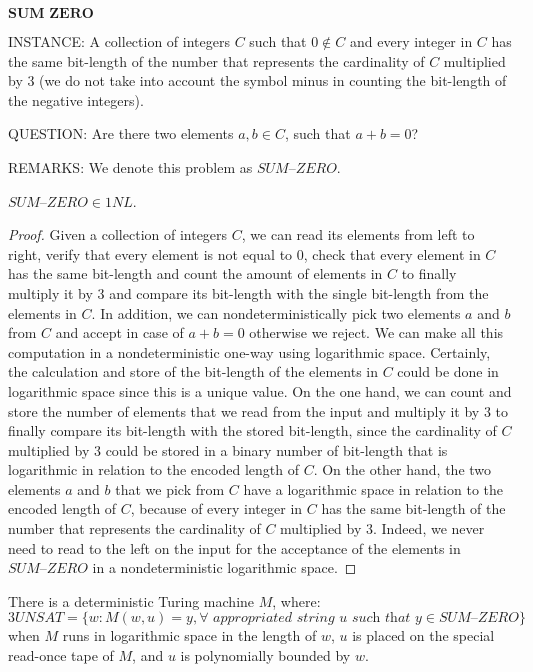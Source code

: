 \documentclass[a4paper,UKenglish,cleveref, autoref]{lipics-v2019}
\begin{document}
\begin{definition}
$\textbf{SUM ZERO}$

INSTANCE: A collection of integers $C$ such that $0 \notin C$ and every integer in $C$ has the same bit-length of the number that represents the cardinality of $C$ multiplied by $3$ (we do not take into account the symbol minus in counting the bit-length of the negative integers).

QUESTION: Are there two elements $a, b \in C$, such that $a + b = 0$?

REMARKS: We denote this problem as $\textit{SUM--ZERO}$.
\end{definition}


\begin{theorem}
\label{1nl}
$\textit{SUM--ZERO} \in 1NL$.
\end{theorem}

\begin{proof}
Given a collection of integers $C$, we can read its elements from left to right, verify that every element is not equal to $0$, check that every element in $C$ has the same bit-length and count the amount of elements in $C$ to finally multiply it by $3$ and compare its bit-length with the single bit-length from the elements in $C$. In addition, we can nondeterministically pick two elements $a$ and $b$ from $C$ and accept in case of $a + b = 0$ otherwise we reject. We can make all this computation in a nondeterministic one-way using logarithmic space. Certainly, the calculation and store of the bit-length of the elements in $C$ could be done in logarithmic space since this is a unique value. On the one hand, we can count and store the number of elements that we read from the input and multiply it by $3$ to finally compare its bit-length with the stored bit-length, since the cardinality of $C$ multiplied by $3$ could be stored in a binary number of bit-length that is logarithmic in relation to the encoded length of $C$. On the other hand, the two elements $a$ and $b$ that we pick from $C$ have a logarithmic space in relation to the encoded length of $C$, because of every integer in $C$ has the same bit-length of the number that represents the cardinality of $C$ multiplied by $3$. Indeed, we never need to read to the left on the input for the acceptance of the elements in $\textit{SUM--ZERO}$ in a nondeterministic logarithmic space.
\end{proof}

\begin{theorem}
\label{demonstration}
There is a deterministic Turing machine $M$, where:
\[3UNSAT = \{w: M(w, u) = y, \forall \textit{ appropriated string } u \textit{ such that } y \in \textit{SUM--ZERO}\}\]
when $M$ runs in logarithmic space in the length of $w$, $u$ is placed on the special read-once tape of $M$, and $u$ is polynomially bounded by $w$.
\end{theorem}
\end{document}
